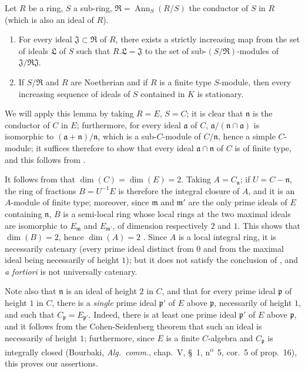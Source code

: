 \begin{example}[5.6.11]
\begin{lemma}[5.6.11.1]
\label{IV.5.6.11.1}
Let $R$ be a ring, $S$ a sub-ring, $\mathfrak{R}=\operatorname{Ann}_S(R/S)$ the conductor of $S$ in $R$ (which is also an ideal of $R$).
\begin{enumerate}[label=(\roman*)]
  \item For every ideal $\mathfrak{J}\subset\mathfrak{R}$ of $R$, there exists a strictly increasing map from the set of ideals $\mathfrak{L}$ of $S$ such that $R.\mathfrak{L}=\mathfrak{J}$ to the set of sub-$(S/\mathfrak{R})$-modules of $\mathfrak{J}/\mathfrak{R}\mathfrak{J}$.
  \item If $S/\mathfrak{R}$ and $R$ are Noetherian and if $R$ is a finite type $S$-module, then every increasing sequence of ideals of $S$ contained in $K$ is stationary.
\end{enumerate}
\end{lemma}

We will apply this lemma by taking $R=E$, $S=C$; it is clear that $\mathfrak{n}$ is the conductor of $C$ in $E$; furthermore, for every ideal $\mathfrak{a}$ of $C$, $\mathfrak{a}/(\mathfrak{n}\cap\mathfrak{a})$ is isomorphic to $(\mathfrak{a}+\mathfrak{n})/\mathfrak{n}$, which is a sub-$C$-module of $C/\mathfrak{n}$, hence a simple $C$-module; it suffices therefore to show that every ideal $\mathfrak{a}\cap\mathfrak{n}$ of $C$ is of finite type, and this follows from .

It follows from  that $\dim(C)=\dim(E)=2$.
Taking $A=C_\mathfrak{n}$; if $U=C-\mathfrak{n}$, the ring of fractions $B=U^{-1}E$ is therefore the integral closure of $A$, and it is an $A$-module of finite type; moreover, since $\mathfrak{m}$ and $\mathfrak{m}'$ are the only prime ideals of $E$ containing $\mathfrak{n}$, $B$ is a semi-local ring whose local rings at the two maximal ideals are isomorphic to $E_\mathfrak{m}$ and $E_{\mathfrak{m}'}$, of dimension respectively $2$ and $1$.
This shows that $\dim(B)=2$, hence $\dim(A)=2$ .
Since $A$ is a local integral ring, it is necessarily catenary (every prime ideal distinct from $0$ and from the maximal ideal being necessarily of height $1$); but it does not satisfy the conclusion of , and \emph{a fortiori} is not universally catenary.

Note also that $\mathfrak{n}$ is an ideal of height $2$ in $C$, and that for every prime ideal $\mathfrak{p}$ of height $1$ in $C$, there is a \emph{single} prime ideal $\mathfrak{p}'$ of $E$ above $\mathfrak{p}$, necessarily of height $1$, and such that $C_\mathfrak{p}=E_{\mathfrak{p}'}$.
Indeed, there is at least one prime ideal $\mathfrak{p}'$ of $E$ above $\mathfrak{p}$, and it follows from the Cohen-Seidenberg theorem that
such an ideal is necessarily of height $1$; furthermore, since $E$ is a finite $C$-algebra and $C_\mathfrak{p}$ is integrally closed (Bourbaki, \emph{Alg.\ comm.}, chap.~V, \S~1, n\textsuperscript{o}~5, cor.~5 of prop.~16), this proves our assertions.


\end{example}
